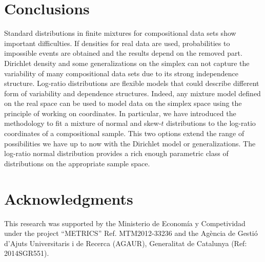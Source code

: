 \documentclass[10pt, a4paper]{article}
\begin{document}
\section{Conclusions}
\label{conclusion_section}
Standard distributions in finite mixtures for compositional data sets show important difficulties. If densities for real data are used, probabilities to impossible events are obtained and the results depend on the removed part. Dirichlet density and some generalizations on the simplex can not capture the variability of many compositional data sets due to its strong independence structure. Log-ratio distributions are flexible models that could describe different form of variability and dependence structures. Indeed, any mixture model defined on the real space can be used to model data on the simplex space using the principle of working on coordinates. In particular, we have introduced the methodology to fit a mixture of normal and skew-$t$ distributions to the log-ratio coordinates of a compositional sample. This two options extend the range of possibilities we have up to now with the Dirichlet model or generalizations. The log-ratio normal distribution provides a rich enough parametric class of distributions on the appropriate sample space. 

\section*{Acknowledgments}
This research was supported by the Ministerio de Econom\'ia y Competividad under the project
``METRICS'' Ref. MTM2012-33236 and the Agència de Gestió d'Ajuts Universitaris i de Recerca (AGAUR), Generalitat de Catalunya (Ref: 2014SGR551).

\end{document}
